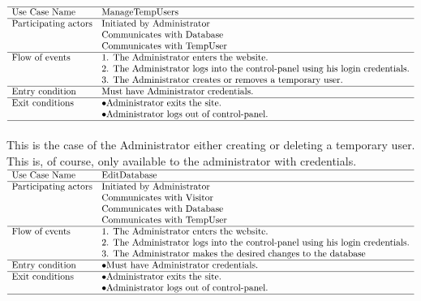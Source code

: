 \documentclass[12pt,a4paper]{article}
\begin{document}
$\begin{array}{ll}
\hline
\text{Use Case Name}	& \text{ManageTempUsers}\\
\hline
\text{Participating
	actors}	& \text{Initiated by Administrator}\\
& \text{Communicates with Database}\\
& \text{Communicates with TempUser}\\
\hline
\text{Flow of events}	& \text{1. The Administrator enters the website.}\\
& \text{2. The Administrator logs into the control-panel using his login credentials.} \\
& \text{3. The Administrator creates or removes a temporary user.}\\
\hline
\text{Entry condition}	& \text{Must have Administrator credentials.}\\
\hline
\text{Exit conditions}	& \bullet \text{Administrator exits the site.}\\
& \bullet \text{Administrator logs out of control-panel.}\\
\hline
\end{array}$\\
\\
This is the case of the Administrator either creating or deleting a temporary user. This is, of course, only available to the administrator with credentials.\\

$\begin{array}{ll}
\hline
\text{Use Case Name}	& \text{EditDatabase}\\
\hline
\text{Participating
	actors}	& \text{Initiated by Administrator}\\
& \text{Communicates with Visitor}\\
& \text{Communicates with Database}\\
& \text{Communicates with TempUser}\\
\hline
\text{Flow of events}	& \text{1. The Administrator enters the website.}\\
& \text{2. The Administrator logs into the control-panel using his login credentials.} \\
& \text{3. The Administrator makes the desired changes to the database}\\
\hline
\text{Entry condition}	& \bullet \text{Must have Administrator credentials.}\\
\hline
\text{Exit conditions}	& \bullet \text{Administrator exits the site.}\\
& \bullet \text{Administrator logs out of control-panel.}\\
\hline
\end{array}$
\\
\end{document}
